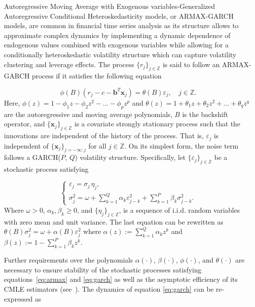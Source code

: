 \documentclass[10pt,a4paper,oneside]{article}
\newcommand{\Z}{\mathbb{Z}}
\begin{document}
Autoregressive Moving Average with Exogenous variables-Generalized Autoregressive Conditional Heteroskedasticity models, or ARMAX-GARCH models, are common in financial time series analysis as its structure allows to approximate complex dynamics by implementing a dynamic dependence of endogenous values combined with exogenous variables while allowing for a conditionally heteroskedastic volatility structure which can capture volatility clustering and leverage effects. The process $\{r_j\}_{j \in \Z}$ is said to follow an ARMAX-GARCH process if it satisfies the following equation

\begin{equation}
    \phi(B) \left( r_j - c - \mathbf{b}^T \mathbf{x}_j \right) = \theta(B) \varepsilon_j, \quad j \in \Z.
    \label{eq:armax}
\end{equation}
Here, $\phi(z) = 1 - \phi_1 z - \phi_2 z^2 - \dots - \phi_p z^p$ and $\theta(z) = 1 + \theta_1 z + \theta_2 z^2 + \dots + \theta_q z^q$ are the autoregressive and moving average polynomials, $B$ is the backshift operator, and $\{ \mathbf{x}_j \}_{j \in \Z}$ is a covariate strongly stationary process such that the innovations are independent of the history of the process. That is, $\varepsilon_j$ is independent of $\{ \mathbf{x}_j \}_{j = - \infty : j}$ for all $j \in \Z$. On its simplest form, the noise term follows a GARCH($P$, $Q$) volatility structure. Specifically, let $\{ \varepsilon_j \}_{j \in \Z}$ be a stochastic process satisfying

\begin{equation}
    \begin{cases}
        \varepsilon_j = \sigma_j \,\eta_j, \\[6pt]
        \sigma_j^2 = \omega + \sum^{Q}_{k = 1} \alpha_k \varepsilon^2_{j - k} + \sum^P_{k = 1} \beta_k \sigma_{j - k}^2.
    \end{cases}
    \label{eq:garch}
\end{equation}
Where $\omega > 0$, $\alpha_k, \beta_k \geq 0$, and $\{ \eta_j\}_{j \in \Z}$, is a sequence of i.i.d. random variables with zero mean and unit variance. The last equation can be rewritten as $\theta(B) \sigma^2_j = \omega + \alpha(B) \varepsilon^2_j$ where $\alpha(z) := \sum^Q_{k = 1} \alpha_k z^k$ and $\beta(z) := 1 - \sum^P_{k = 1} \beta_k z^k$.

Further requirements over the polynomials $\alpha(\cdot)$, $\beta(\cdot)$, $\phi(\cdot)$, and $\theta(\cdot)$ are necessary to ensure stability of the stochastic processes satisfying equations~\eqref{eq:armax} and \eqref{eq:garch} as well as the asymptotic efficiency of its CMLE estimators (see~\cite{mejia2025asymptotic}). The dynamics of equation \eqref{eq:garch} can be re-expressed as
\end{document}
